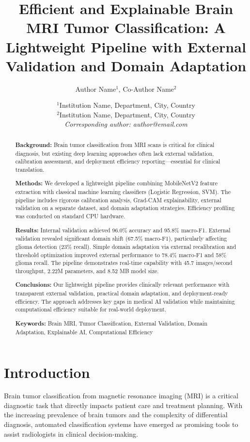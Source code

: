 \documentclass[11pt,a4paper]{article}
\title{\textbf{Efficient and Explainable Brain MRI Tumor Classification: A Lightweight Pipeline with External Validation and Domain Adaptation}}
\author{Author Name$^1$, Co-Author Name$^2$}
\date{
$^1$Institution Name, Department, City, Country\\
$^2$Institution Name, Department, City, Country\\
\vspace{0.5cm}
\textit{Corresponding author: author@email.com}
}
\begin{document}
\maketitle

\begin{abstract}
\textbf{Background:} Brain tumor classification from MRI scans is critical for clinical diagnosis, but existing deep learning approaches often lack external validation, calibration assessment, and deployment efficiency reporting—essential for clinical translation.

\textbf{Methods:} We developed a lightweight pipeline combining MobileNetV2 feature extraction with classical machine learning classifiers (Logistic Regression, SVM). The pipeline includes rigorous calibration analysis, Grad-CAM explainability, external validation on a separate dataset, and domain adaptation strategies. Efficiency profiling was conducted on standard CPU hardware.

\textbf{Results:} Internal validation achieved 96.0\% accuracy and 95.8\% macro-F1. External validation revealed significant domain shift (67.5\% macro-F1), particularly affecting glioma detection (23\% recall). Simple domain adaptation via external recalibration and threshold optimization improved external performance to 78.4\% macro-F1 and 58\% glioma recall. The pipeline demonstrates real-time capability with 45.7 images/second throughput, 2.22M parameters, and 8.52 MB model size.

\textbf{Conclusions:} Our lightweight pipeline provides clinically relevant performance with transparent external validation, practical domain adaptation, and deployment-ready efficiency. The approach addresses key gaps in medical AI validation while maintaining computational efficiency suitable for real-world deployment.

\textbf{Keywords:} Brain MRI, Tumor Classification, External Validation, Domain Adaptation, Explainable AI, Computational Efficiency
\end{abstract}

\section{Introduction}

Brain tumor classification from magnetic resonance imaging (MRI) is a critical diagnostic task that directly impacts patient care and treatment planning. With the increasing prevalence of brain tumors and the complexity of differential diagnosis, automated classification systems have emerged as promising tools to assist radiologists in clinical decision-making.
\end{document}
